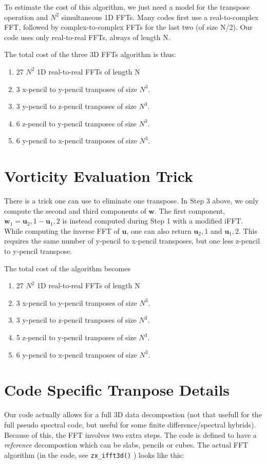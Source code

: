 \documentclass[12pt]{article}
\newcommand{\uv}{\mathbf u}
\newcommand{\vor}{\mathbf w}
\begin{document}
To estimate the cost of this algorithm, we just need a model for the
transpose operation and $N^2$ simultaneous 1D FFTs.  
Many codes first use a real-to-complex FFT, followed by
complex-to-complex FFTs for the last two (of size N/2).  
Our code uses only real-to-real FFTs, always of length N.

The total cost of the three 3D FFTs algorithm is thus:
\begin{enumerate}
\item 27 $N^2$ 1D real-to-real FFTs of length N
\item 3 x-pencil to y-pencil tranposes of size $N^3$.  
\item 3 y-pencil to z-pencil tranposes of size $N^3$.  
\item 6 z-pencil to y-pencil tranposes of size $N^3$.  
\item 6 y-pencil to x-pencil tranposes of size $N^3$.  
\end{enumerate}


\section{Vorticity Evaluation Trick}


There is a trick one can use to eliminate one transpose.
In Step 3 above, we only compute the second and third components
of $\vor$.  The first component, $\vor_1 = \uv_2,1 - \uv_1,2$ is
instead computed during Step 1 with a modified iFFT.  While
computing the inverse FFT of $\uv$, one can also return 
$\uv_2,1$ and $\uv_1,2$.  This requires the same number of
y-pencil to x-pencil transposes, but one less z-pencil to y-pencil
transpose.  

The total cost of the algorithm becomes
\begin{enumerate}
\item 27 $N^2$ 1D real-to-real FFTs of length N
\item 3 x-pencil to y-pencil tranposes of size $N^3$.  
\item 3 y-pencil to z-pencil tranposes of size $N^3$.  
\item 5 z-pencil to y-pencil tranposes of size $N^3$.  
\item 6 y-pencil to x-pencil tranposes of size $N^3$.  
\end{enumerate}

\section{Code Specific Tranpose Details}
Our code actually allows for a full 3D data decompostion
(not that usefull for the full pseudo spectral code, but useful
for some finite difference/spectral hybrids).  Because of this,
the FFT involves two extra steps.  The code
is defined to have a {\em reference} decompostion which
can be slabs, pencils or cubes.  The actual FFT algorithm
(in the code, see \texttt{zx\_ifft3d()} ) looks like this:
\end{document}
